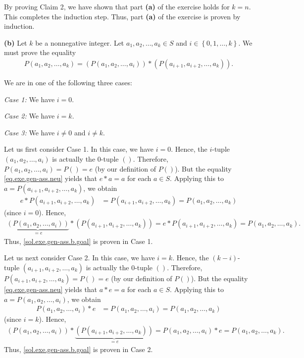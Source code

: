 \documentclass[paper=a4, fontsize=12pt]{scrartcl} %
\newcommand{\set}[1]{\left\{ #1 \right\}}
\newcommand{\tup}[1]{\left( #1 \right)}
\theoremstyle{plainsl}
\theoremstyle{definition}
\theoremstyle{remark}
\begin{document}
By proving Claim 2, we have shown that
part \textbf{(a)} of the exercise
holds for $k = n$.
This completes the induction step.
Thus, part \textbf{(a)} of the exercise
is proven by induction.

\vspace{0.8pc}

\textbf{(b)}
Let $k$ be a nonnegative integer.
Let $a_1, a_2, \ldots, a_k \in S$
and $i \in \set{0, 1, \ldots, k}$.
We must prove the equality
\begin{align}
P \tup{a_1, a_2, \ldots, a_k}
= \tup{P \tup{a_1, a_2, \ldots, a_i}}
     * \tup{P \tup{a_{i+1}, a_{i+2}, \ldots, a_k}} .
\label{sol.exe.gen-ass.b.goal}
\end{align}

We are in one of the following three cases:

\textit{Case 1:} We have $i = 0$.

\textit{Case 2:} We have $i = k$.

\textit{Case 3:} We have $i \neq 0$ and $i \neq k$.

Let us first consider Case 1.
In this case, we have $i = 0$.
Hence, the $i$-tuple $\tup{a_1, a_2, \ldots, a_i}$
is actually the $0$-tuple $\tup{}$.
Therefore, $P \tup{a_1, a_2, \ldots, a_i} = P \tup{} = e$
(by our definition of $P \tup{}$).
But the equality \eqref{eq.exe.gen-ass.neu} yields that
$e * a = a$ for each $a \in S$.
Applying this to $a = P \tup{a_{i+1}, a_{i+2}, \ldots, a_k}$,
we obtain
\begin{align*}
e * P \tup{a_{i+1}, a_{i+2}, \ldots, a_k}
&= P \tup{a_{i+1}, a_{i+2}, \ldots, a_k}
 = P \tup{a_1, a_2, \ldots, a_k}
\end{align*}
(since $i = 0$).
Hence,
\begin{align*}
 \underbrace{\tup{P \tup{a_1, a_2, \ldots, a_i}}}_{= e}
     * \tup{P \tup{a_{i+1}, a_{i+2}, \ldots, a_k}}
 = e * P \tup{a_{i+1}, a_{i+2}, \ldots, a_k}
 = P \tup{a_1, a_2, \ldots, a_k} .
\end{align*}
Thus, \eqref{sol.exe.gen-ass.b.goal} is proven in Case 1.

Let us next consider Case 2.
In this case, we have $i = k$.
Hence, the $\tup{k-i}$-tuple $\tup{a_{i+1}, a_{i+2}, \ldots, a_k}$
is actually the $0$-tuple $\tup{}$.
Therefore, $P \tup{a_{i+1}, a_{i+2}, \ldots, a_k} = P \tup{} = e$
(by our definition of $P \tup{}$).
But the equality \eqref{eq.exe.gen-ass.neu} yields that
$a * e = a$ for each $a \in S$.
Applying this to $a = P \tup{a_1, a_2, \ldots, a_i}$,
we obtain
\begin{align*}
P \tup{a_1, a_2, \ldots, a_i} * e
&= P \tup{a_1, a_2, \ldots, a_i}
 = P \tup{a_1, a_2, \ldots, a_k}
\end{align*}
(since $i = k$).
Hence,
\begin{align*}
 \tup{P \tup{a_1, a_2, \ldots, a_i}}
     * \underbrace{\tup{P \tup{a_{i+1}, a_{i+2}, \ldots, a_k}}}_{= e}
 = P \tup{a_1, a_2, \ldots, a_i} * e
 = P \tup{a_1, a_2, \ldots, a_k} .
\end{align*}
Thus, \eqref{sol.exe.gen-ass.b.goal} is proven in Case 2.
\end{document}
